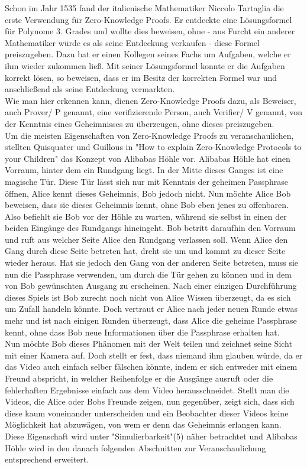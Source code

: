 \documentclass {article}
\begin{document}
Schon im Jahr 1535 fand der italienische Mathematiker Niccolo Tartaglia die erste Verwendung für Zero-Knowledge Proofs\cite{BSW}. Er entdeckte eine Lösungsformel für Polynome 3. Grades und wollte dies beweisen, ohne - aus Furcht ein anderer Mathematiker würde es als seine Entdeckung verkaufen - diese Formel preiszugeben. Dazu bat er einen Kollegen seines Fachs um Aufgaben, welche er ihm wieder zukommen lie\ss{}. Mit seiner L\"osungsformel konnte er die Aufgaben korrekt l\"osen, so beweisen, dass er im Besitz der korrekten Formel war und anschlie\ss{}end als seine Entdeckung vermarkten. \\

Wie man hier erkennen kann, dienen Zero-Knowledge Proofs dazu, als Beweiser, auch Prover/ P genannt, eine
verifizierende Person, auch Verifier/ V genannt, von der Kenntnis eines Geheimnisses zu überzeugen, ohne dieses preiszugeben. \\ 

Um die meisten Eigenschaften von Zero-Knowledge Proofs zu veranschaulichen, stellten Quisquater und Guillous in "How to explain Zero-Knowledge Protocols to your Children"\cite{GQ89} das Konzept von Alibabas H\"ohle vor.
Alibabas H\"ohle hat einen Vorraum, hinter dem ein Rundgang liegt. In der Mitte dieses Ganges ist eine magische T\"ur. Diese T\"ur l\"asst sich nur mit Kenntnis der geheimen Passphrase \"offnen,
Alice kennt dieses Geheimnis, Bob jedoch nicht.
Nun m\"ochte Alice Bob beweisen, dass sie dieses Geheimnis kennt, ohne Bob eben jenes zu offenbaren. Also befiehlt sie Bob vor der H\"ohle zu warten, w\"ahrend sie selbst in einen der beiden Eing\"ange des Rundgangs hineingeht. Bob betritt daraufhin den Vorraum und ruft aus welcher Seite Alice den Rundgang verlassen soll. Wenn Alice den Gang durch diese Seite betreten hat, dreht sie um und kommt zu dieser Seite wieder heraus. Hat sie jedoch den Gang von der anderen Seite betreten, muss sie nun die Passphrase verwenden, um durch die T\"ur gehen zu k\"onnen und in dem von Bob gewünschten Ausgang zu erscheinen. Nach einer einzigen Durchf\"uhrung dieses Spiels ist Bob zurecht noch nicht von Alice Wissen \"uberzeugt, da es sich um Zufall handeln k\"onnte. Doch vertraut er Alice nach jeder neuen Runde etwas mehr und ist nach einigen Runden \"uberzeugt, dass Alice die geheime Passphrase kennt, ohne dass Bob neue Informationen \"uber die Passphrase erhalten hat. \\ 

Nun m\"ochte Bob dieses Ph\"anomen mit der Welt teilen und zeichnet seine Sicht mit einer Kamera auf. Doch stellt er fest, dass niemand ihm glauben würde, da er das Video auch einfach selber f\"alschen k\"onnte, indem er sich entweder mit einem Freund abspricht, in welcher Reihenfolge er die Ausg\"ange ausruft oder die fehlerhaften Ergebnisse einfach aus dem Video herausschneidet. 
Stellt man die Videos, die Alice oder Bobs Freunde zeigen, nun gegen\"uber, zeigt sich, dass sich diese kaum voneinander unterscheiden und ein Beobachter dieser Videos keine M\"oglichkeit hat abzuw\"agen, von wem er denn das Geheimnis erlangen kann.
Diese Eigenschaft wird unter "Simulierbarkeit"(5) n\"aher betrachtet und Alibabas H\"ohle wird in den danach folgenden Abschnitten zur Veranschaulichung entsprechend erweitert.
\end{document}
